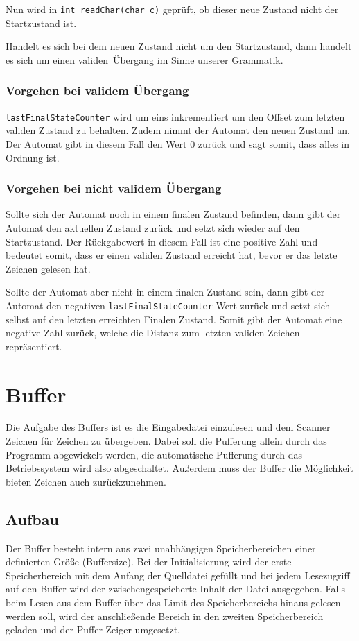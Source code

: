 \documentclass[listof=totoc,DIV11,a4paper]{scrreprt}
\begin{document}
Nun wird in \verb+int readChar(char c)+ geprüft, ob dieser neue Zustand nicht der Startzustand ist.

Handelt es sich bei dem neuen Zustand nicht um den Startzustand, dann handelt es sich um einen \glqq validen\grqq\ Übergang im Sinne unserer Grammatik.

\subsubsection{Vorgehen bei validem Übergang}
\verb+lastFinalStateCounter+ wird um eins inkrementiert um den Offset zum letzten validen Zustand zu behalten.
Zudem nimmt der Automat den neuen Zustand an.
Der Automat gibt in diesem Fall den Wert 0 zurück und sagt somit, dass alles in Ordnung ist.

\subsubsection{Vorgehen bei nicht validem Übergang}
Sollte sich der Automat noch in einem finalen Zustand befinden, dann gibt der Automat den aktuellen Zustand zurück und setzt sich wieder auf den Startzustand.
Der Rückgabewert in diesem Fall ist eine positive Zahl und bedeutet somit, dass er einen validen Zustand erreicht hat, bevor er das letzte Zeichen gelesen hat.

Sollte der Automat aber nicht in einem finalen Zustand sein, dann gibt der Automat den negativen \verb+lastFinalStateCounter+ Wert zurück und setzt sich selbst auf den letzten erreichten Finalen Zustand.
Somit gibt der Automat eine negative Zahl zurück, welche die Distanz zum letzten validen Zeichen repräsentiert.


\section{Buffer}\label{sec:buffer}
Die Aufgabe des Buffers ist es die Eingabedatei einzulesen und dem Scanner Zeichen für Zeichen zu übergeben. Dabei soll die Pufferung allein durch das Programm abgewickelt werden, die automatische Pufferung durch das Betriebssystem wird also abgeschaltet. Außerdem muss der Buffer die Möglichkeit bieten Zeichen auch zurückzunehmen. %

\subsection{Aufbau}
Der Buffer besteht intern aus zwei unabhängigen Speicherbereichen einer definierten Größe (Buffersize). Bei der Initialisierung wird der erste Speicherbereich mit dem Anfang der Quelldatei gefüllt und bei jedem Lesezugriff auf den Buffer wird der zwischengespeicherte Inhalt der Datei ausgegeben. Falls beim Lesen aus dem Buffer über das Limit des Speicherbereichs hinaus gelesen werden soll, wird der anschließende Bereich in den zweiten Speicherbereich geladen und der Puffer-Zeiger umgesetzt.
\end{document}
